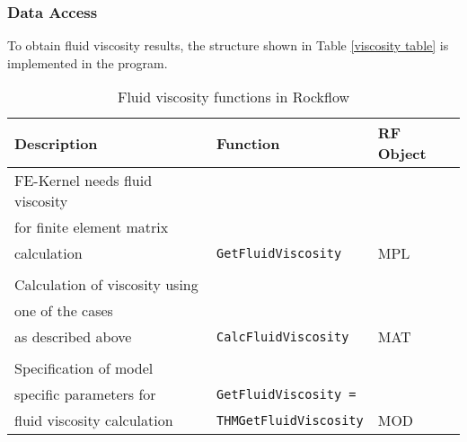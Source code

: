 \subsubsection*{Data Access}
To obtain fluid viscosity results, the structure shown in Table
\ref{viscosity table} is implemented in the program.
\begin{table}[htb]
\centering
\begin{tabular}{|lll|}
\hline
\rule[-3mm]{0mm}{8mm}{\textbf{Description}}& \textbf{Function} & \textbf{RF Object}\\
\hline
FE-Kernel needs fluid viscosity&& \\
for finite element matrix&&\\
calculation & \texttt{GetFluidViscosity} & MPL\\
&&\\
Calculation of viscosity using &&\\
one of the cases &&\\
as described above & \texttt{CalcFluidViscosity} & MAT\\
&&\\
Specification of model&& \\
specific parameters for & \texttt{GetFluidViscosity =} & \\
fluid viscosity calculation & \texttt{THMGetFluidViscosity} & MOD\\
\hline
\end{tabular}
\caption{Fluid viscosity functions in Rockflow}\label{viscosity
table}
\end{table}
